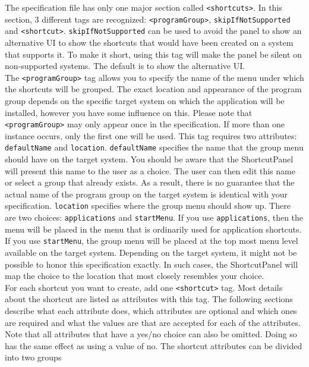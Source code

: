 The specification file has only one major section called \texttt{<shortcuts>}.
In this section, 3 different tags are recognized: \texttt{<programGroup>},
\texttt{skipIfNotSupported} and \texttt{<shortcut>}. \texttt{skipIfNotSupported}
can be used to avoid the panel to show an alternative UI to show the shortcuts
that would have been created on a system that supports it. To make it short,
using this tag will make the panel be silent on non-supported systems. The
default is to show the alternative UI.\\

The \texttt{<programGroup>} tag allows you to specify the name of the
menu under which the shortcuts will be grouped. The exact location and
appearance of the program group depends on the specific target system on
which the application will be installed, however you have some influence
on this. Please note that \texttt{<programGroup>} may only appear once
in the specification. If more than one instance occurs, only the first
one will be used. This tag requires two attributes: \texttt{defaultName}
and \texttt{location}. \texttt{defaultName} specifies the name that the
group menu should have on the target system. You should be aware that
the ShortcutPanel will present this name to the user as a choice. The
user can then edit this name or select a group that already exists. As a
result, there is no guarantee that the actual name of the program group
on the target system is identical with your specification.
\texttt{location} specifies where the group menu should show up. There
are two choices: \texttt{applications} and \texttt{startMenu}. If you
use \texttt{applications}, then the menu will be placed in the menu that
is ordinarily used for application shortcuts. If you use
\texttt{startMenu}, the group menu will be placed at the top most menu
level available on the target system. Depending on the target system, it
might not be possible to honor this specification exactly. In such
cases, the ShortcutPanel will map the choice to the location that most
closely resembles your choice.\\

For each shortcut you want to create, add one \texttt{<shortcut>} tag.
Most details about the shortcut are listed as attributes with this tag.
The following sections describe what each attribute does, which
attributes are optional and which ones are required and what the values
are that are accepted for each of the attributes. Note that all
attributes that have a yes/no choice can also be omitted. Doing so has
the same effect as using a value of no. The shortcut attributes can be
divided into two groups\\

